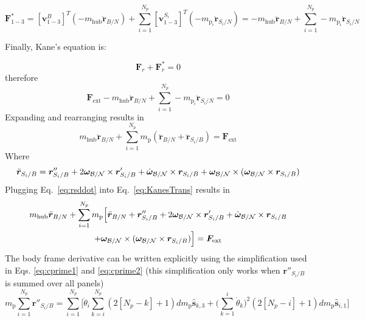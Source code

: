 \begin{equation}
	\bm F^*_{1-3} = [\bm v^{B}_{1-3}]^T (-m_{\text{hub}} \ddot{\bm r}_{B/N}) + \sum\limits_{i=1}^{N_p}[\bm v^{S_i}_{1-3}]^T (-m_{\text{p}_i} \ddot{\bm r}_{S_{i}/N}) = -m_{\text{hub}} \ddot{\bm r}_{B/N} + \sum\limits_{i=1}^{N_p} -m_{\text{p}_i}\ddot{\bm r}_{S_{i}/N}
\end{equation}

Finally, Kane's equation is:

\begin{equation}
	\bm F_r + \bm F^*_r = 0
	\label{eq:KanesEq}
\end{equation}
therefore
\begin{equation}
	\bm F_{\text{ext}} -m_{\text{hub}} \ddot{\bm r}_{B/N} + \sum\limits_{i=1}^{N_p} -m_{\text{p}_i}\ddot{\bm r}_{S_{i}/N} = 0
\end{equation}
Expanding and rearranging results in
\begin{equation}
	m_{\text{hub}} \ddot{\bm r}_{B/N}  + \sum\limits_{i=1}^{N_p} m_{\text{p}} (\ddot{\bm r}_{B/N} + \ddot{\bm r}_{S_{i}/B}) = \bm F_{\text{ext}}
	\label{eq:KanesTrans}
\end{equation}
Where
\begin{equation}
	\ddot{\bm r}_{S_i/B} = \bm{r}''_{S_i/B} + 2 \bm\omega_{\cal B/N} \times \bm{r}'_{S_i/B} +  \dot{\bm\omega}_{\cal B/N} \times \bm{r}_{S_i/B} + \bm\omega_{\cal B/N} \times (\bm\omega_{\cal B/N} \times \bm{r}_{S_i/B})
	\label{eq:rsddot}
\end{equation}
Plugging Eq.~\eqref{eq:rsddot} into Eq.~\eqref{eq:KanesTrans} results in
\begin{multline}
	m_{\text{hub}} \ddot{\bm r}_{B/N} +  \sum\limits_{i=1}^{N_p} m_{\text{p}} \Big[\ddot{\bm r}_{B/N} +  \bm{r}''_{S_i/B}
	+ 2 \bm\omega_{\cal B/N} \times \bm{r}'_{S_i/B} +  \dot{\bm\omega}_{\cal B/N} \times \bm{r}_{S_i/B}
	\\ + \bm\omega_{\cal B/N} \times (\bm\omega_{\cal B/N} \times \bm{r}_{S_i/B})\Big] = \bm F_{\text{ext}}
\end{multline}
The body frame derivative can be written explicitly using the simplification used in Eqs. \ref{eq:cprime1} and \ref{eq:cprime2} (this simplification only works when $\bm{r}''_{S_i/B}$ is summed over all panels) 
\begin{equation}
	m_{\text{p}} \sum^{N_p}_{i=1} \bm{r}''_{S_i/B} = \sum^{N_p}_{i=1} \Big[ \ddot{\theta}_i \sum^{N_p}_{k=i} (2[N_p-k]+1) d m_{\text{p}} \bm{\hat{s}}_{k,3} + \Big(\sum^{i}_{k=1}\dot{\theta}_k\Big)^2 (2[N_p-i]+1) d m_{\text{p}} \bm{\hat{s}}_{i,1} \Big]
\end{equation}
